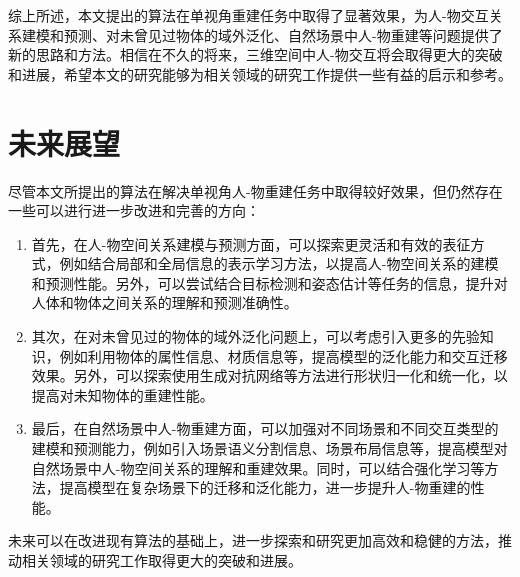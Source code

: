 综上所述，本文提出的算法在单视角重建任务中取得了显著效果，为人-物交互关系建模和预测、对未曾见过物体的域外泛化、自然场景中人-物重建等问题提供了新的思路和方法。相信在不久的将来，三维空间中人-物交互将会取得更大的突破和进展，希望本文的研究能够为相关领域的研究工作提供一些有益的启示和参考。

\section{未来展望}

尽管本文所提出的算法在解决单视角人-物重建任务中取得较好效果，但仍然存在一些可以进行进一步改进和完善的方向：
\begin{enumerate}
	\item 首先，在人-物空间关系建模与预测方面，可以探索更灵活和有效的表征方式，例如结合局部和全局信息的表示学习方法，以提高人-物空间关系的建模和预测性能。另外，可以尝试结合目标检测和姿态估计等任务的信息，提升对人体和物体之间关系的理解和预测准确性。
	\item 其次，在对未曾见过的物体的域外泛化问题上，可以考虑引入更多的先验知识，例如利用物体的属性信息、材质信息等，提高模型的泛化能力和交互迁移效果。另外，可以探索使用生成对抗网络等方法进行形状归一化和统一化，以提高对未知物体的重建性能。
	\item 最后，在自然场景中人-物重建方面，可以加强对不同场景和不同交互类型的建模和预测能力，例如引入场景语义分割信息、场景布局信息等，提高模型对自然场景中人-物空间关系的理解和重建效果。同时，可以结合强化学习等方法，提高模型在复杂场景下的迁移和泛化能力，进一步提升人-物重建的性能。
\end{enumerate}

未来可以在改进现有算法的基础上，进一步探索和研究更加高效和稳健的方法，推动相关领域的研究工作取得更大的突破和进展。